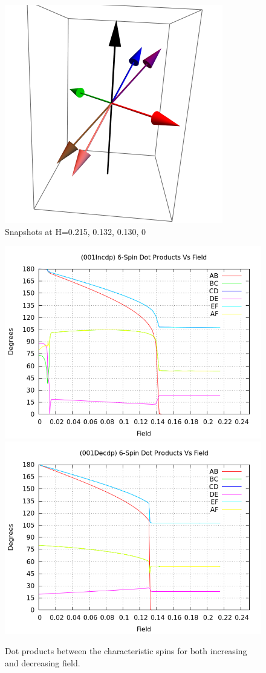\documentclass{article}
\begin{document}
\begin{figure}[ht]
\includegraphics[scale=0.37]{HVariedData/Pictures/001Dec216.png}
\caption{Snapshots at H=0.215, 0.132, 0.130, 0}
\end{figure}

\begin{figure}[ht]
\centering
\includegraphics[scale=0.55]{HVariedData/Pictures/001Incdp.png}
\includegraphics[scale=0.55]{HVariedData/Pictures/001Decdp.png}
\caption{Dot products between the characteristic spins for both increasing and decreasing field.}
\end{figure}
\end{document}
